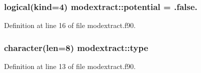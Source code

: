 \subsubsection[{\texorpdfstring{potential}{potential}}]{\setlength{\rightskip}{0pt plus 5cm}logical(kind=4) modextract\+::potential = .false.}\hypertarget{namespacemodextract_a0bd93be7d411f7058ed49057de38d60f}{}\label{namespacemodextract_a0bd93be7d411f7058ed49057de38d60f}


Definition at line 16 of file modextract.\+f90.

\subsubsection[{\texorpdfstring{type}{type}}]{\setlength{\rightskip}{0pt plus 5cm}character(len=8) modextract\+::type}\hypertarget{namespacemodextract_af65545877ed74e44b340c563fb91e81c}{}\label{namespacemodextract_af65545877ed74e44b340c563fb91e81c}


Definition at line 13 of file modextract.\+f90.


